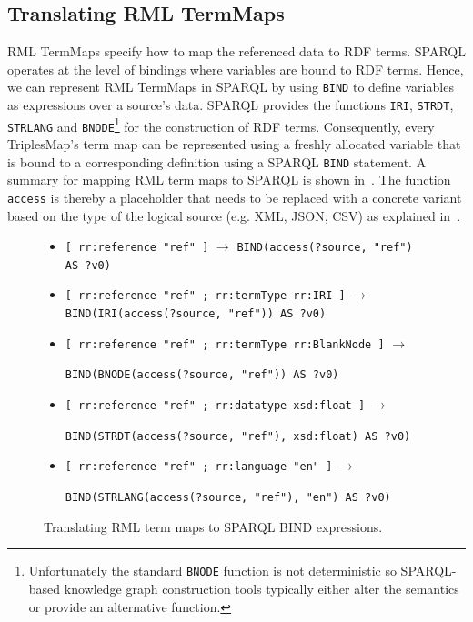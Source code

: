 \subsection{Translating RML TermMaps}
RML TermMaps specify how to map the referenced data to RDF terms.
SPARQL operates at the level of bindings where variables are bound to RDF terms.
Hence, we can represent RML TermMaps in SPARQL by using \texttt{BIND} to define variables as expressions over a source's data.
SPARQL provides the functions \texttt{IRI}, \texttt{STRDT}, \texttt{STRLANG} and \texttt{BNODE}\footnote{Unfortunately the standard \texttt{BNODE} function is not deterministic so SPARQL-based knowledge graph construction tools typically either alter the semantics or provide an alternative function.} for the construction of RDF terms.
Consequently, every TriplesMap's term map can be represented using a freshly allocated variable that is bound to a corresponding definition using a SPARQL \texttt{BIND} statement. A summary for mapping RML term maps to SPARQL is shown in~. The function \texttt{access} is thereby a placeholder that needs to be replaced with a concrete variant based on the type of the logical source (e.g. XML, JSON, CSV) as explained in~.

\begin{figure}
\begin{footnotesize}
\begin{itemize}
  \item \lstinline{[ rr:reference "ref" ]} $\rightarrow$ \lstinline{BIND(access(?source, "ref") AS ?v0)}
  \item \lstinline{[ rr:reference "ref" ; rr:termType rr:IRI ]} $\rightarrow$ \lstinline{BIND(IRI(access(?source, "ref")) AS ?v0)}
  \item \lstinline{[ rr:reference "ref" ; rr:termType rr:BlankNode ]} $\rightarrow$

  \hspace{1cm}\lstinline{BIND(BNODE(access(?source, "ref")) AS ?v0)}
  \item \lstinline{[ rr:reference "ref" ; rr:datatype xsd:float ]} $\rightarrow$

  \hspace{1cm}\lstinline{BIND(STRDT(access(?source, "ref"), xsd:float) AS ?v0)}
  \item \lstinline{[ rr:reference "ref" ; rr:language "en" ]} $\rightarrow$

  \hspace{1cm}\lstinline{BIND(STRLANG(access(?source, "ref"), "en") AS ?v0)}
\end{itemize}
\end{footnotesize}
 \vspace*{-5mm}
\caption{Translating RML term maps to SPARQL BIND expressions.}
\label{fig:tm-to-sparql}
\end{figure}

